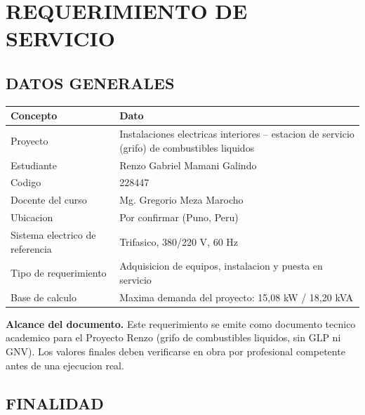 \documentclass[12pt,letterpaper]{report}
\newcommand{\reqnote}[1]{%
  \begingroup
  \setlength{\fboxsep}{8pt}%
  \colorbox{azulunap!8}{%
    \begin{minipage}{0.94\textwidth}
      #1
    \end{minipage}%
  }%
  \endgroup
}
\newcommand{\reqheader}{\rowcolor{azulunap!14}}
\begin{document}
\hypersetup{pageanchor=false}

\clearpage
\hypersetup{pageanchor=true}

\pagestyle{memoria}
\renewcommand{\documentfootertext}{REQUERIMIENTO DE SERVICIO - INSTALACIONES ELECTRICAS}

\tableofcontents
\clearpage

\chapter*{REQUERIMIENTO DE SERVICIO}

\section{DATOS GENERALES}

\begin{table}[H]
\centering
\renewcommand{\arraystretch}{1.18}
\begin{tabularx}{\textwidth}{P{0.34\textwidth} L}
\toprule
\reqheader \textbf{Concepto} & \textbf{Dato} \\
\midrule
Proyecto & Instalaciones electricas interiores -- estacion de servicio (grifo) de combustibles liquidos \\
Estudiante & Renzo Gabriel Mamani Galindo \\
Codigo & 228447 \\
Docente del curso & Mg. Gregorio Meza Marocho \\
Ubicacion & Por confirmar (Puno, Peru) \\
Sistema electrico de referencia & Trifasico, 380/220 V, 60 Hz \\
Tipo de requerimiento & Adquisicion de equipos, instalacion y puesta en servicio \\
Base de calculo & Maxima demanda del proyecto: 15,08 kW / 18,20 kVA \\
\bottomrule
\end{tabularx}
\end{table}

\reqnote{%
\textbf{Alcance del documento.} Este requerimiento se emite como documento tecnico academico para el Proyecto Renzo (grifo de combustibles liquidos, sin GLP ni GNV). Los valores finales deben verificarse en obra por profesional competente antes de una ejecucion real.%
}

\section{FINALIDAD}
\end{document}
